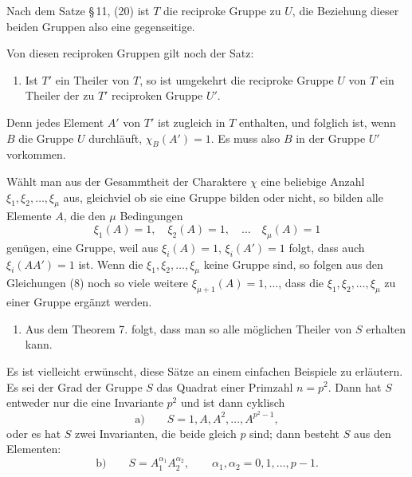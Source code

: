 \documentclass[11pt]{article}
\begin{document}
Nach dem Satze \S\,11, (20) ist $T$ die reciproke Gruppe zu $U$, die Beziehung dieser beiden Gruppen also eine gegenseitige.

Von diesen reciproken Gruppen gilt noch der Satz:

\begin{enumerate}[resume,label=\arabic*.]
\item Ist $T'$ ein Theiler von $T$, so ist umgekehrt die reciproke Gruppe $U$ von $T$ ein Theiler der zu $T'$ reciproken Gruppe $U'$.
\end{enumerate}

Denn jedes Element $A'$ von $T'$ ist zugleich in $T$ enthalten, und folglich ist, wenn $B$ die Gruppe $U$ durchläuft, $\chi_B(A')=1$. Es muss also $B$ in der Gruppe $U'$ vorkommen.

Wählt man aus der Gesammtheit der Charaktere $\chi$ eine beliebige Anzahl $\xi_1,\xi_2,\ldots,\xi_\mu$ aus, gleichviel ob sie eine Gruppe bilden oder nicht, so bilden alle Elemente $A$, die den $\mu$ Bedingungen
\begin{equation}
\xi_1(A)=1,
\quad \xi_2(A)=1,
\quad\ldots\quad
\xi_\mu(A)=1
\tag{8}
\end{equation}
genügen, eine Gruppe, weil aus $\xi_i(A)=1$, $\xi_i(A')=1$ folgt, dass auch $\xi_i(AA')=1$ ist. Wenn die $\xi_1,\xi_2,
\ldots,\xi_\mu$ keine Gruppe sind, so folgen aus den Gleichungen (8) noch so viele weitere $\xi_{\mu+1}(A)=1,\ldots$, dass die $\xi_1,\xi_2,
\ldots,
\xi_\mu$ zu einer Gruppe ergänzt werden.

\begin{enumerate}[resume,label=\arabic*.]
\item Aus dem Theorem 7. folgt, dass man so alle möglichen Theiler von $S$ erhalten kann.
\end{enumerate}

Es ist vielleicht erwünscht, diese Sätze an einem einfachen Beispiele zu erläutern. Es sei der Grad der Gruppe $S$ das Quadrat einer Primzahl $n=p^2$. Dann hat $S$ entweder nur die eine Invariante $p^2$ und ist dann cyklisch
\begin{equation*}
\text{a)}\qquad S=1,A,A^2,
\ldots,A^{p^2-1},
\end{equation*}
oder es hat $S$ zwei Invarianten, die beide gleich $p$ sind; dann besteht $S$ aus den Elementen:
\begin{equation*}
\text{b)}\qquad S=A_1^{\alpha_1}A_2^{\alpha_2},
\qquad \alpha_1,\alpha_2=0,1,\ldots,p-1.
\end{equation*}
\end{document}
